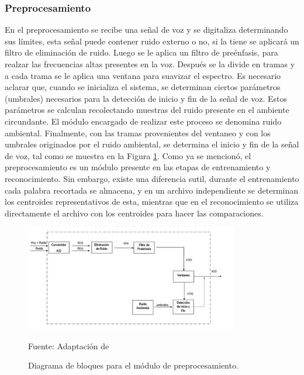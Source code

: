 \subsubsection{Preprocesamiento}
En el preprocesamiento se recibe una señal de voz y se digitaliza determinando sus límites, esta señal puede contener ruido externo o no, si la tiene se aplicará un filtro de eliminación de ruido. Luego se le aplica un filtro de preénfasis, para realzar las frecuencias altas presentes en la voz. Después se la divide en tramas y a cada trama se le aplica una ventana para suavizar el espectro. 
\vskip 0.5cm
Es necesario aclarar que, cuando se inicializa el sistema, se determinan ciertos parámetros (umbrales) necesarios para la detección de inicio y fin de la señal de voz. Estos parámetros se calculan recolectando muestras del ruido presente en el ambiente circundante. El módulo encargado de realizar este proceso se denomina ruido ambiental. Finalmente, con las tramas provenientes del ventaneo y con los umbrales originados por el ruido ambiental, se determina el inicio y fin de la señal de voz, tal como se muestra en la Figura \ref{fig:figura2.7}.
\vskip 0.5cm
Como ya se mencionó, el preprocesamiento es un módulo presente en las etapas de entrenamiento y reconocimiento. Sin embargo, existe una diferencia sutil, durante el entrenamiento cada palabra recortada se almacena, y en un archivo independiente se determinan los centroides representativos de esta, mientras que en el reconocimiento se utiliza directamente el archivo con los centroides para hacer las comparaciones.

\begin{figure}[ht]
\begin{center}
\includegraphics[width=0.83\textwidth]{Imagenes/Cap2/image007}
\end{center}
\begin{center}
\vskip -0.5cm
\caption{\small{Diagrama de bloques para el módulo de preprocesamiento.}}
\label{fig:figura2.7}
{\small{Fuente: Adaptación de \cite{navarrete}}}
\end{center}
\end{figure}

